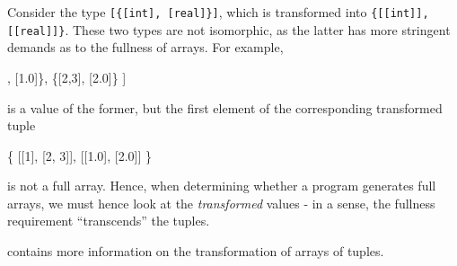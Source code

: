 Consider the type \texttt{[\{[int], [real]\}]}, which is transformed
into \texttt{\{[[int]], [[real]]\}}.  These two types are not
isomorphic, as the latter has more stringent demands as to the
fullness of arrays.  For example,
\begin{colorcode}
[
 \{[1],   [1.0]\},
 \{[2,3], [2.0]\}
]
\end{colorcode}
is a value of the former, but the first element of the
corresponding transformed tuple
\begin{colorcode}
\{
 [[1],   [2, 3]],
 [[1.0], [2.0]]
\}
\end{colorcode}
is not a full array.  Hence, when determining whether a program
generates full arrays, we must hence look at the \textit{transformed}
values - in a sense, the fullness requirement ``transcends'' the
tuples.

 contains more information on the
transformation of arrays of tuples.

